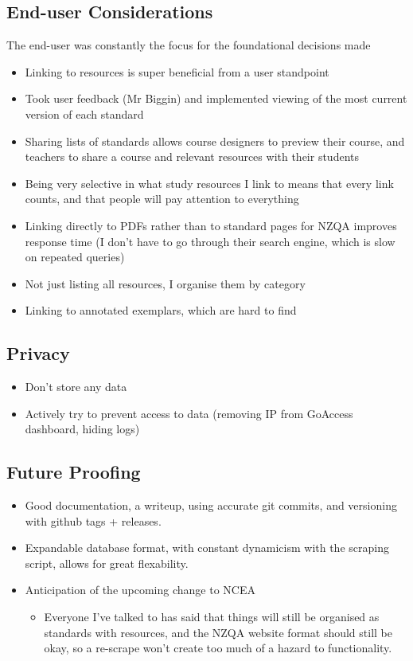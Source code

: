 \documentclass{article}
\begin{document}
\subsection*{End-user Considerations}
The end-user was constantly the focus for the foundational decisions made
\begin{itemize}
    \item Linking to resources is super beneficial from a user standpoint
    \item Took user feedback (Mr Biggin) and implemented viewing of the most current version of each standard
    \item Sharing lists of standards allows course designers to preview their course, and teachers to share a course and relevant resources with their students
    \item Being very selective in what study resources I link to means that every link counts, and that people will pay attention to everything
    \item Linking directly to PDFs rather than to standard pages for NZQA improves response time (I don't have to go through their search engine, which is slow on repeated queries)
    \item Not just listing all resources, I organise them by category
    \item Linking to annotated exemplars, which are hard to find
\end{itemize}


\subsection*{Privacy}
\begin{itemize}
    \item Don't store any data
    \item Actively try to prevent access to data (removing IP from GoAccess dashboard, hiding logs)
\end{itemize}

\subsection*{Future Proofing}
\begin{itemize}
    \item Good documentation, a writeup, using accurate git commits, and versioning with github tags + releases. 
    \item Expandable database format, with constant dynamicism with the scraping script, allows for great flexability.
    \item Anticipation of the upcoming change to NCEA
    \begin{itemize}
        \item Everyone I've talked to has said that things will still be organised as standards with resources, and the NZQA website format should still be okay, so a re-scrape won't create too much of a hazard to functionality.
    \end{itemize}
\end{itemize}
\end{document}
